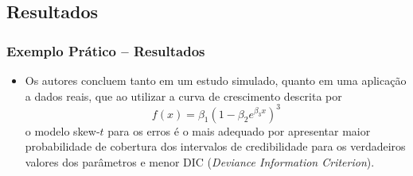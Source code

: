\documentclass[13pt, aspectratio=169]{beamer}
\begin{document}
\subsection{Resultados}

\begin{frame}
    \frametitle{Exemplo Prático -- Resultados}

    \begin{itemize}
        \item Os autores concluem tanto em um estudo simulado, quanto em uma aplicação a dados reais, que ao utilizar a curva de crescimento descrita por
            \begin{equation*}
                f(x) = \beta_1 (1 - \beta_2 e^{\beta_3 x} )^3
            \end{equation*}
            o modelo skew-$t$ para os erros é o mais adequado por apresentar maior probabilidade de cobertura dos intervalos de credibilidade para os verdadeiros valores dos parâmetros e menor DIC (\textit{Deviance Information Criterion}).
    \end{itemize}

\end{frame}
\end{document}
